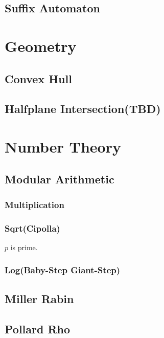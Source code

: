 \documentclass{article}
\begin{document}
    \subsection{Suffix Automaton}
        
\section{Geometry}
    \subsection{Convex Hull}
        
    \subsection{Halfplane Intersection(TBD)}
        
\section{Number Theory}
    \subsection{Modular Arithmetic}
        \subsubsection{Multiplication}
            
        \subsubsection{Sqrt(Cipolla)}
            $p$ is prime.
            
        \subsubsection{Log(Baby-Step Giant-Step)}
            
    \subsection{Miller Rabin}
        
    \subsection{Pollard Rho}
        
\end{document}
